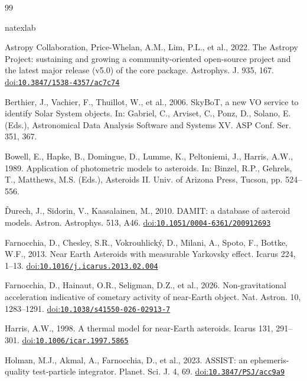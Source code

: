 \documentclass[3p,11pt]{elsarticle}
\begin{document}
\begin{thebibliography}{99}\small\raggedright
\setlength{\itemsep}{1pt}
\expandafter\ifx\csname natexlab\endcsname\relax\def\natexlab#1{#1}\fi

Astropy Collaboration, Price-Whelan, A.M., Lim, P.L., et al., 2022. The Astropy Project:
sustaining and growing a community-oriented open-source project and the latest major release
(v5.0) of the core package. Astrophys. J. 935, 167. \href{https://doi.org/10.3847/1538-4357/ac7c74}{doi:\nolinkurl{10.3847/1538-4357/ac7c74}}

Berthier, J., Vachier, F., Thuillot, W., et al., 2006. SkyBoT, a new VO service to identify
Solar System objects. In: Gabriel, C., Arviset, C., Ponz, D., Solano, E. (Eds.), Astronomical
Data Analysis Software and Systems XV. ASP Conf. Ser. 351, 367.

Bowell, E., Hapke, B., Domingue, D., Lumme, K., Peltoniemi, J., Harris, A.W., 1989.
Application of photometric models to asteroids. In: Binzel, R.P., Gehrels, T., Matthews,
M.S. (Eds.), Asteroids II. Univ. of Arizona Press, Tucson, pp. 524--556.

{\v{D}}urech, J., Sidorin, V., Kaasalainen, M., 2010. DAMIT: a database of asteroid models.
Astron. Astrophys. 513, A46. \href{https://doi.org/10.1051/0004-6361/200912693}{doi:\nolinkurl{10.1051/0004-6361/200912693}}

Farnocchia, D., Chesley, S.R., Vokrouhlick{\'y}, D., Milani, A., Spoto, F., Bottke, W.F.,
2013. Near Earth Asteroids with measurable Yarkovsky effect. Icarus 224, 1--13.
\href{https://doi.org/10.1016/j.icarus.2013.02.004}{doi:\nolinkurl{10.1016/j.icarus.2013.02.004}}

Farnocchia, D., Hainaut, O.R., Seligman, D.Z., et al., 2026. Non-gravitational acceleration
indicative of cometary activity of near-Earth object. Nat. Astron. 10, 1283--1291.
\href{https://doi.org/10.1038/s41550-026-02913-7}{doi:\nolinkurl{10.1038/s41550-026-02913-7}}

Harris, A.W., 1998. A thermal model for near-Earth asteroids. Icarus 131, 291--301.
\href{https://doi.org/10.1006/icar.1997.5865}{doi:\nolinkurl{10.1006/icar.1997.5865}}

Holman, M.J., Akmal, A., Farnocchia, D., et al., 2023. ASSIST: an ephemeris-quality
test-particle integrator. Planet. Sci. J. 4, 69. \href{https://doi.org/10.3847/PSJ/acc9a9}{doi:\nolinkurl{10.3847/PSJ/acc9a9}}


\end{thebibliography}
\end{document}
